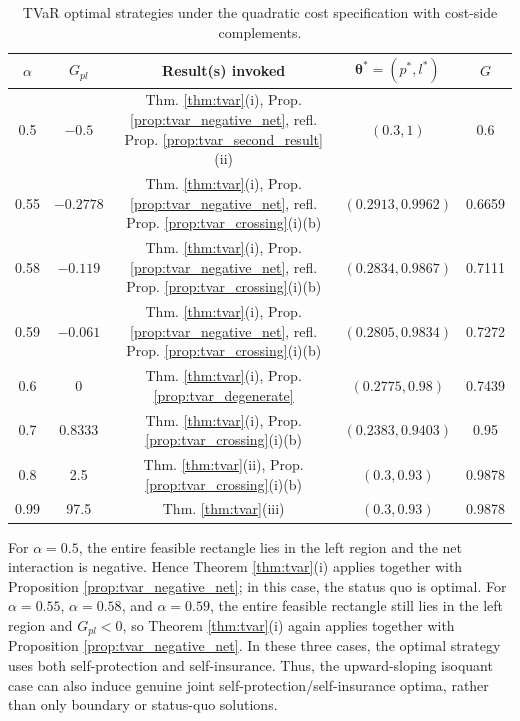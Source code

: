 \documentclass[a4paper,12pt]{article}
\begin{document}
\begin{table}[htbp]
\centering
\small
\begin{tabular}{c c c c c}
\hline
\(\alpha\) & \(G_{pl}\) & Result(s) invoked & \({\bm\theta}^*=\left(p^*,l^*\right)\) & \(G\) \\
\hline
0.5 & \(-0.5\) & Thm. \ref{thm:tvar}(i), Prop. \ref{prop:tvar_negative_net}, refl. Prop. \ref{prop:tvar_second_result}(ii) & \(\left(0.3,1\right)\) & 0.6 \\
0.55 & \(-0.2778\) & Thm. \ref{thm:tvar}(i), Prop. \ref{prop:tvar_negative_net}, refl. Prop. \ref{prop:tvar_crossing}(i)(b) & \(\left(0.2913,0.9962\right)\) & 0.6659 \\
0.58 & \(-0.119\) & Thm. \ref{thm:tvar}(i), Prop. \ref{prop:tvar_negative_net}, refl. Prop. \ref{prop:tvar_crossing}(i)(b) & \(\left(0.2834,0.9867\right)\) & 0.7111 \\
0.59 & \(-0.061\) & Thm. \ref{thm:tvar}(i), Prop. \ref{prop:tvar_negative_net}, refl. Prop. \ref{prop:tvar_crossing}(i)(b) & \(\left(0.2805,0.9834\right)\) & 0.7272 \\
0.6 & 0 & Thm. \ref{thm:tvar}(i), Prop. \ref{prop:tvar_degenerate} & \(\left(0.2775,0.98\right)\) & 0.7439 \\
0.7 & 0.8333 & Thm. \ref{thm:tvar}(i), Prop. \ref{prop:tvar_crossing}(i)(b) & \(\left(0.2383,0.9403\right)\) & 0.95 \\
0.8 & 2.5 & Thm. \ref{thm:tvar}(ii), Prop. \ref{prop:tvar_crossing}(i)(b) & \(\left(0.3,0.93\right)\) & 0.9878 \\
0.99 & 97.5 & Thm. \ref{thm:tvar}(iii) & \(\left(0.3,0.93\right)\) & 0.9878 \\
\hline
\end{tabular}
\caption{TVaR optimal strategies under the quadratic cost specification with cost-side complements.}
\label{tab:tvar_confidence_illustration}
\end{table}

\noindent
For $\alpha=0.5$, the entire feasible rectangle lies in the left region and the net interaction is negative. Hence Theorem \ref{thm:tvar}(i) applies together with Proposition \ref{prop:tvar_negative_net}; in this case, the status quo is optimal. For $\alpha=0.55$, $\alpha=0.58$, and $\alpha=0.59$, the entire feasible rectangle still lies in the left region and $G_{pl}<0$, so Theorem \ref{thm:tvar}(i) again applies together with Proposition \ref{prop:tvar_negative_net}. In these three cases, the optimal strategy uses both self-protection and self-insurance. Thus, the upward-sloping isoquant case can also induce genuine joint self-protection/self-insurance optima, rather than only boundary or status-quo solutions.
\end{document}
